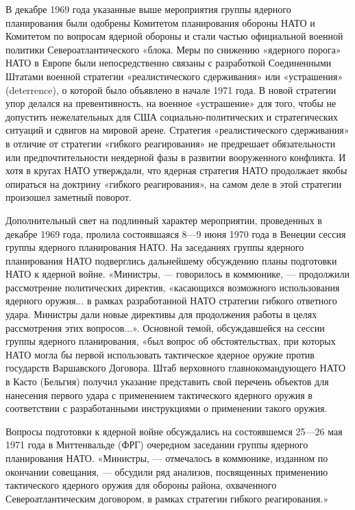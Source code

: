 \documentclass[12pt, a4paper, openany]{book}
\begin{document}
	В декабре 1969 года указанные выше мероприятия группы ядерного планирования были одобрены Комитетом планирования обороны НАТО и Комитетом по вопросам ядерной обороны и стали частью официальной военной политики Североатлантического «блока. Меры по снижению «ядерного порога» НАТО в Европе были непосредственно связаны с разработкой Соединенными Штатами военной стратегии «реалистического сдерживания» или «устрашения» (deterrence), о которой было объявлено в начале 1971 года. В новой стратегии упор делался на превентивность, на военное «устрашение» для того, чтобы не допустить нежелательных для США социально-политических и стратегических ситуаций и сдвигов на мировой арене. Стратегия «реалистического сдерживания» в отличие от стратегии «гибкого реагирования» не предрешает обязательности или предпочтительности неядерной фазы в развитии вооруженного конфликта. И хотя в кругах НАТО утверждали, что ядерная стратегия НАТО продолжает якобы опираться на доктрину «гибкого реагирования», на самом деле в этой стратегии произошел заметный поворот.
	
	Дополнительный свет на подлинный характер мероприятии, проведенных в декабре 1969 года, пролила состоявшаяся 8—9 июня 1970 года в Венеции сессия группы ядерного планирования НАТО. На заседаниях группы ядерного планирования НАТО подверглись дальнейшему обсуждению планы подготовки НАТО к ядерной войне. «Министры, — говорилось в коммюнике, — продолжили рассмотрение политических директив, «касающихся возможного использования ядерного оружия... в рамках разработанной НАТО стратегии гибкого ответного удара. Министры дали новые директивы для продолжения работы в целях рассмотрения этих вопросов...». Основной темой, обсуждавшейся на сессии группы ядерного планирования, «был вопрос об обстоятельствах, при которых НАТО могла бы первой использовать тактическое ядерное оружие против государств Варшавского Договора. Штаб верховного главнокомандующего НАТО в Касто (Бельгия) получил указание представить свой перечень объектов для нанесения первого удара с применением тактического ядерного оружия в соответствии с разработанными инструкциями о применении такого оружия.
	
	Вопросы подготовки к ядерной войне обсуждались на состоявшемся 25—26 мая 1971 года в Миттенвальде (ФРГ) очередном заседании группы ядерного планирования НАТО. «Министры, — отмечалось в коммюнике, изданном по окончании совещания, — обсудили ряд анализов, посвященных применению тактического ядерного оружия для обороны района, охваченного Североатлантическим договором, в рамках стратегии гибкого реагирования.»
	
\end{document}

